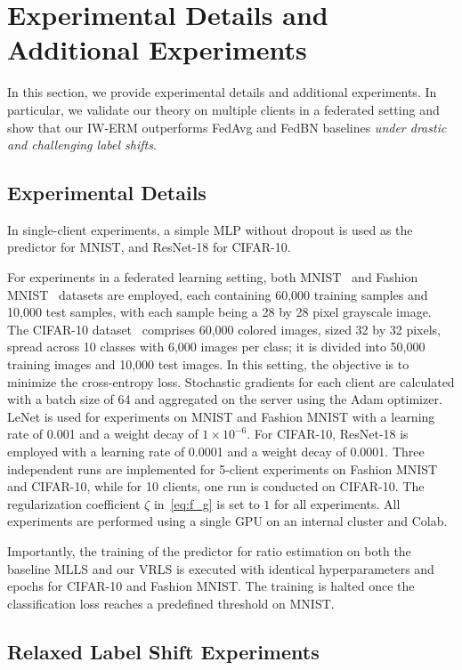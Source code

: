 
\section{Experimental Details and Additional Experiments}\label{app:exp}

In this section, we provide experimental details and additional experiments. In particular,  we validate our theory on multiple clients in a federated setting and show that our IW-ERM outperforms FedAvg and FedBN baselines {\it under drastic and challenging label shifts}. 

\subsection{Experimental Details}

In single-client experiments, a simple MLP without dropout is used as the predictor for MNIST, and ResNet-18 for CIFAR-10.

For experiments in a federated learning setting, both MNIST~\citep{MNIST} and Fashion MNIST~\citep{f-mnist} datasets are employed, each containing 60,000 training samples and 10,000 test samples, with each sample being a 28 by 28 pixel grayscale image. The CIFAR-10 dataset~\citep{CIFAR10} comprises 60,000 colored images, sized 32 by 32 pixels, spread across 10 classes with 6,000 images per class; it is divided into 50,000 training images and 10,000 test images. In this setting, the objective is to minimize the cross-entropy loss. Stochastic gradients for each client are calculated with a batch size of 64 and aggregated on the server using the Adam optimizer. LeNet is used for experiments on MNIST and Fashion MNIST with a learning rate of 0.001 and a weight decay of \(1 \times 10^{-6}\). For CIFAR-10, ResNet-18 is employed with a learning rate of 0.0001 and a weight decay of 0.0001. Three independent runs are implemented for 5-client experiments on Fashion MNIST and CIFAR-10, while for 10 clients, one run is conducted on CIFAR-10. The regularization coefficient $\zeta$ in~\cref{eq:f_g} is set to $1$ for all experiments.
All experiments are performed using a single GPU on an internal cluster and Colab.

Importantly, the training of the predictor for ratio estimation on both the baseline MLLS and our VRLS is executed with identical hyperparameters and epochs for CIFAR-10 and Fashion MNIST. The training is halted once the classification loss reaches a predefined threshold on MNIST.


\subsection{Relaxed Label Shift Experiments}\label{rlbg2}

